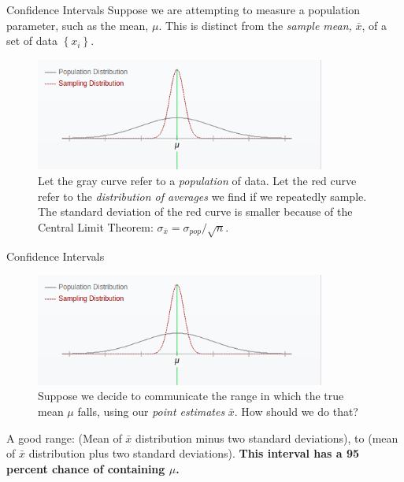 \documentclass{beamer}
\begin{document}
\begin{frame}{Confidence Intervals}
Suppose we are attempting to measure a population parameter, such as the mean, $\mu$.  This is distinct from the \textit{sample mean,} $\bar{x}$, of a set of data $\left \lbrace x_i \right \rbrace$.
\begin{figure}
\centering
\includegraphics[width=0.85\textwidth]{figures/samples.png}
\caption{\label{fig:samp} Let the gray curve refer to a \textit{population} of data.  Let the red curve refer to the \textit{distribution of averages} we find if we repeatedly sample.  The standard deviation of the red curve is smaller because of the Central Limit Theorem: $\sigma_{\bar{x}} = \sigma_{pop}/\sqrt{n}$.}
\end{figure}
\end{frame}

\begin{frame}{Confidence Intervals}
\begin{figure}
\centering
\includegraphics[width=0.85\textwidth]{figures/samples.png}
\caption{\label{fig:samp2} Suppose we decide to communicate the range in which the true mean $\mu$ falls, using our \textit{point estimates} $\bar{x}$.  How should we do that?}
\end{figure}

A good range: (Mean of $\bar{x}$ distribution minus two standard deviations), to (mean of $\bar{x}$ distribution plus two standard deviations).  \textbf{\alert{This interval has a 95 percent chance of containing $\mu$.}}
\end{frame}
\end{document}
